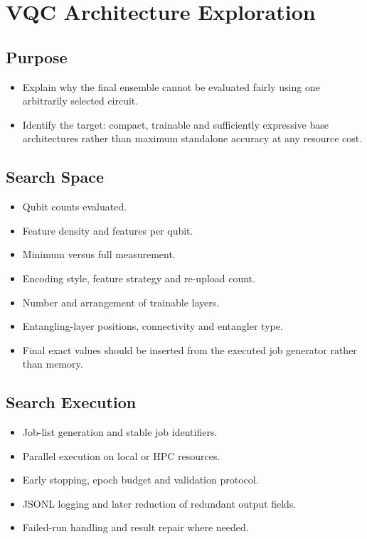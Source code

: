 \documentclass[]{UCD_CS_MSc_AAI_Report}
\begin{document}
\section{VQC Architecture Exploration}
\label{sec:method-vqc-search}

\subsection{Purpose}
\begin{itemize}
    \item Explain why the final ensemble cannot be evaluated fairly using one arbitrarily selected circuit.
    \item Identify the target: compact, trainable and sufficiently expressive base architectures rather than maximum standalone accuracy at any resource cost.
\end{itemize}

\subsection{Search Space}
\begin{itemize}
    \item Qubit counts evaluated.
    \item Feature density and features per qubit.
    \item Minimum versus full measurement.
    \item Encoding style, feature strategy and re-upload count.
    \item Number and arrangement of trainable layers.
    \item Entangling-layer positions, connectivity and entangler type.
    \item Final exact values should be inserted from the executed job generator rather than memory.
\end{itemize}

\subsection{Search Execution}
\begin{itemize}
    \item Job-list generation and stable job identifiers.
    \item Parallel execution on local or HPC resources.
    \item Early stopping, epoch budget and validation protocol.
    \item JSONL logging and later reduction of redundant output fields.
    \item Failed-run handling and result repair where needed.
\end{itemize}
\end{document}
